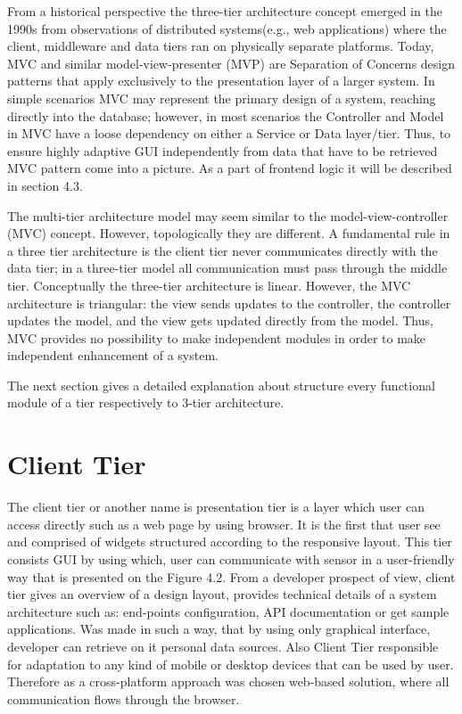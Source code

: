    From a historical perspective the three-tier architecture concept emerged in the 1990s from observations of distributed systems\cite{wiki:3tier}(e.g., web applications) where the client, middleware and data tiers ran on physically separate platforms. Today, MVC and similar model-view-presenter (MVP) are Separation of Concerns design patterns that apply exclusively to the presentation layer of a larger system. In simple scenarios MVC may represent the primary design of a system, reaching directly into the database; however, in most scenarios the Controller and Model in MVC have a loose dependency on either a Service or Data layer/tier. Thus, to ensure highly adaptive GUI independently from data that have to be retrieved MVC pattern come into a picture. As a part of frontend logic it will be described in section 4.3.
  
  The multi-tier architecture model may seem similar to the model-view-controller (MVC) concept. However, topologically they are different. A fundamental rule in a three tier architecture is the client tier never communicates directly with the data tier; in a three-tier model all communication must pass through the middle tier. Conceptually the three-tier architecture is linear. However, the MVC architecture is triangular: the view sends updates to the controller, the controller updates the model, and the view gets updated directly from the model. Thus, MVC provides no possibility to make independent modules in order to make independent enhancement of a system.

  The next section gives a detailed explanation about structure every functional module of a tier respectively to 3-tier architecture.

\section{Client Tier}
  The client tier or another name is presentation tier is a layer which user can access directly such as a web page by using browser. It is the first that user see and comprised of widgets structured according to the responsive layout. This tier consists GUI by using which, user can communicate with sensor in a user-friendly way that is presented on the Figure 4.2. From a developer prospect of view, client tier gives an overview of a design layout, provides technical details of a system architecture such as: end-points configuration, API documentation or get sample applications. Was made in such a way, that by using only graphical interface, developer can retrieve on it personal data sources. Also Client Tier responsible for adaptation to any kind of mobile or desktop devices that can be used by user. Therefore as a cross-platform approach was chosen web-based solution, where all communication flows through the browser. 

